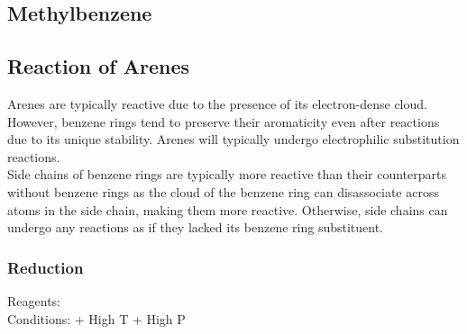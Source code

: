 \documentclass[../main]{subfiles}
\begin{document}
	\begin{center}
	\end{center}

	\subsection{Methylbenzene}


	\begin{center}
	\end{center}


	\begin{center}
	\end{center}

	\subsection{Reaction of Arenes}

	Arenes are typically reactive due to the presence of its electron-dense  cloud. However, benzene rings tend to preserve their aromaticity even after reactions due to its unique stability. Arenes will typically undergo electrophilic substitution reactions. \\

	Side chains of benzene rings are typically more reactive than their counterparts without benzene rings as the  cloud of the benzene ring can disassociate across  atoms in the side chain, making them more reactive. Otherwise, side chains can undergo any reactions as if they lacked its benzene ring substituent.

	\subsubsection{Reduction}

	Reagents: \\
	Conditions:  + High T + High P 
\end{document}
